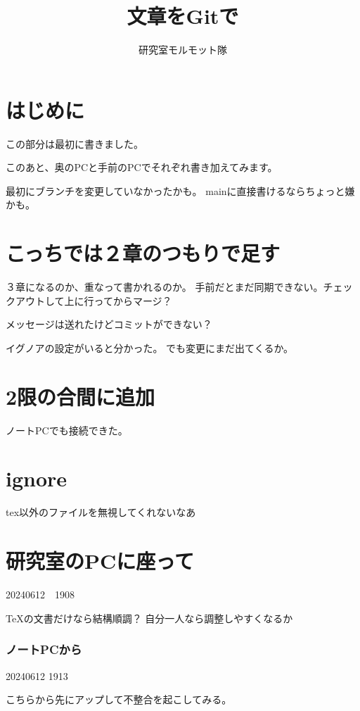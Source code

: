 \documentclass[a4j]{ujarticle}
\title{文章をGitで}
\author{研究室モルモット隊}
\begin{document}
\maketitle
\tableofcontents

\section{はじめに}
この部分は最初に書きました。

このあと、奥のPCと手前のPCでそれぞれ書き加えてみます。

最初にブランチを変更していなかったかも。
mainに直接書けるならちょっと嫌かも。

\section{こっちでは２章のつもりで足す}
３章になるのか、重なって書かれるのか。
手前だとまだ同期できない。チェックアウトして上に行ってからマージ？

メッセージは送れたけどコミットができない？

イグノアの設定がいると分かった。
でも変更にまだ出てくるか。

\section{2限の合間に追加}
ノートPCでも接続できた。

\section{ignore}
tex以外のファイルを無視してくれないなあ

\section{研究室のPCに座って}
20240612　1908

\TeX の文書だけなら結構順調？
自分一人なら調整しやすくなるか

\subsubsection{ノートPCから}
20240612 1913

こちらから先にアップして不整合を起こしてみる。
\end{document}
